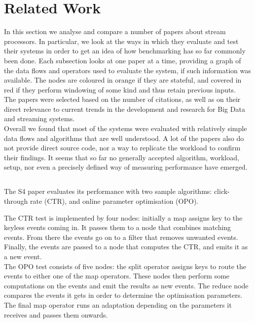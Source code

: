 \section{Related Work}
In this section we analyse and compare a number of papers about stream processors. In particular, we look at the ways in which they evaluate and test their systems in order to get an idea of how benchmarking has so far commonly been done. Each subsection looks at one paper at a time, providing a graph of the data flows and operators used to evaluate the system, if such information was available. The nodes are coloured in orange if they are stateful, and covered in red if they perform windowing of some kind and thus retain previous inputs. \\

The papers were selected based on the number of citations, as well as on their direct relevance to current trends in the development and research for Big Data and streaming systems. \\

Overall we found that most of the systems were evaluated with relatively simple data flows and algorithms that are well understood. A lot of the papers also do not provide direct source code, nor a way to replicate the workload to confirm their findings. It seems that so far no generally accepted algorithm, workload, setup, nor even a precisely defined way of measuring performance have emerged.

\subsection{}
The S4 paper evaluates its performance with two sample algorithms: click-through rate (CTR), and online parameter optimisation (OPO). \\


The CTR test is implemented by four nodes: initially a map assigns key to the keyless events coming in. It passes them to a node that combines matching events. From there the events go on to a filter that removes unwanted events. Finally, the events are passed to a node that computes the CTR, and emits it as a new event. \\

The OPO test consists of five nodes: the split operator assigns keys to route the events to either one of the map operators. These nodes then perform some computations on the events and emit the results as new events. The reduce node compares the events it gets in order to determine the optimisation parameters. The final map operator runs an adaptation depending on the parameters it receives and passes them onwards.

